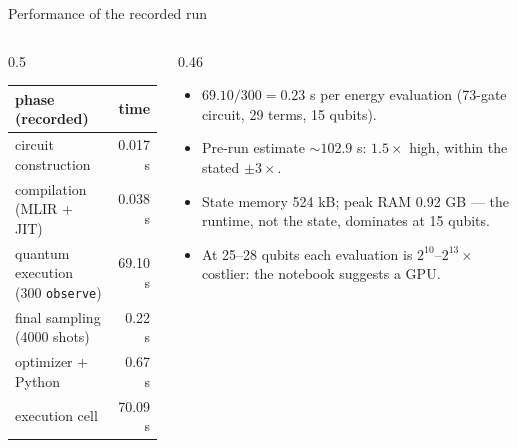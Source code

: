 \documentclass[aspectratio=169,11pt]{beamer}
\begin{document}
\begin{frame}{Performance of the recorded run}
  \begin{columns}[T]
    \begin{column}{0.5\textwidth}
      \small
      \begin{center}
      \begin{tabular}{lr}
        \toprule phase (recorded) & time\\ \midrule
        circuit construction & 0.017 s\\
        compilation (MLIR + JIT) & 0.038 s\\
        quantum execution (300 \texttt{observe}) & 69.10 s\\
        final sampling (4000 shots) & 0.22 s\\
        optimizer + Python & 0.67 s\\ \midrule
        execution cell & 70.09 s\\ \bottomrule
      \end{tabular}
      \end{center}
    \end{column}
    \begin{column}{0.46\textwidth}
      \small
      \begin{itemize}
        \item $69.10/300 = 0.23$ s per energy evaluation (73-gate circuit, 29 terms, 15 qubits).
        \item Pre-run estimate $\sim102.9$ s: $1.5\times$ high, within the stated $\pm3\times$.
        \item State memory 524 kB; peak RAM 0.92 GB --- the runtime, not the state, dominates at 15 qubits.
        \item At 25--28 qubits each evaluation is $2^{10}$--$2^{13}\times$ costlier: the notebook suggests a GPU.
      \end{itemize}
    \end{column}
  \end{columns}
\end{frame}

\end{document}

